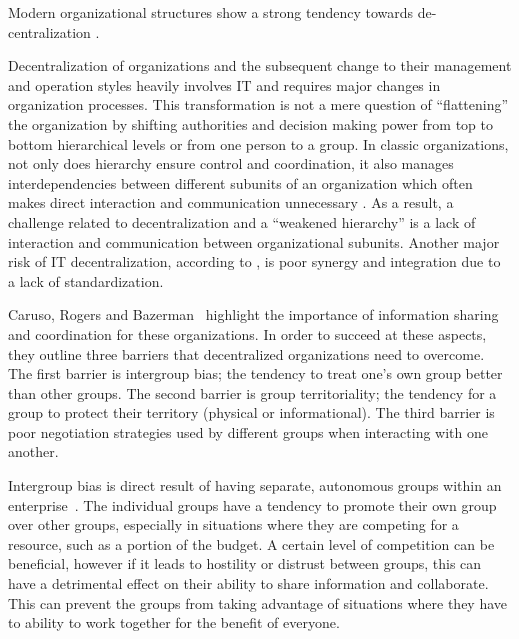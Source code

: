 

Modern organizational structures show a strong tendency towards de-centralization \cite{daft1993}.

Decentralization of organizations and the subsequent change to their management and operation styles heavily involves IT and requires major changes in organization processes. This transformation is not a mere question of ``flattening'' the organization by shifting authorities and decision making power from top to bottom hierarchical levels or from one person to a group. In classic organizations, not only does hierarchy ensure control and coordination, it also manages interdependencies between  different subunits of an organization which often makes direct interaction and communication unnecessary \cite{thompson1967}. As a result, a challenge related to decentralization and a ``weakened hierarchy'' is a lack of interaction and communication between organizational subunits. Another major risk of IT decentralization, according to \cite{Rockart1996}, is poor synergy and integration due to a lack of standardization.

Caruso, Rogers and Bazerman~\cite{caruso2008boundaries} highlight the importance of information sharing and coordination for these organizations. In order to succeed at these aspects, they outline three barriers that decentralized organizations need to overcome. The first barrier is intergroup bias; the tendency to treat one's own group better than other groups. The second barrier is group territoriality; the tendency for a group to protect their territory (physical or informational). The third barrier is poor negotiation strategies used by different groups when interacting with one another. 

Intergroup bias is direct result of having separate, autonomous groups within an enterprise~\cite{caruso2008boundaries}. The individual groups have a tendency to promote their own group over other groups, especially in situations where they are competing for a resource, such as a portion of the budget. A certain level of competition can be beneficial, however if it leads to hostility or distrust between groups, this can have a detrimental effect on their ability to share information and collaborate. This can prevent the groups from taking advantage of situations where they have to ability to work together for the benefit of everyone. 

